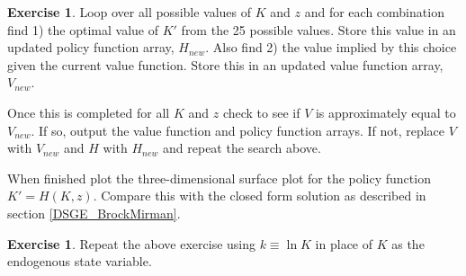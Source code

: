 \documentclass[letterpaper,12pt]{article}
\theoremstyle{definition}
\newtheorem{exercise}[theorem]{Exercise}
\begin{document}
\begin{spacing}{1.5}
\begin{exercise}
		Loop over all possible values of $K$ and $z$ and for each combination find 1) the optimal value of $K'$ from the 25 possible values.  Store this value in an updated policy function array, $H_{new}$.  Also find 2) the value implied by this choice given the current value function.  Store this in an updated value function array, $V_{new}$.

		Once this is completed for all $K$ and $z$ check to see if $V$ is approximately equal to $V_{new}$.  If so, output the value function and policy function arrays.  If not, replace $V$ with $V_{new}$ and $H$ with $H_{new}$ and repeat the search above.

		When finished plot the three-dimensional surface plot for the policy function $K' = H(K,z)$.  Compare this with the closed form solution as described in section \ref{DSGE_BrockMirman}.
	\end{exercise}

	\begin{exercise} \label{DSGE_HW_BM_Grid_Log}
		Repeat the above exercise using $k \equiv \ln K$ in place of $K$ as the endogenous state variable.
	\end{exercise}







\end{spacing}
\end{document}
